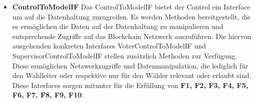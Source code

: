 \documentclass[parskip=full]{scrartcl}
\newcommand{\fakeparagraph}[1]{\textbf{#1}}
\begin{document}
	\begin{itemize}
	\item\fakeparagraph{ControlToModelIF} Das ControlToModelIF bietet der Control ein Interface um auf die Datenhaltung zuzugreifen.
	Es werden Methoden bereitgestellt, die es ermöglichen die Daten auf der Datenhaltung zu manipulieren und entsprechende Zugriffe auf das Blockchain Netzwerk auszuführen.
	Die hiervon ausgehenden konkreten Interfaces VoterControlToModelIF und SupervisorControlToModelIF stellen zusätzlich Methoden zur Verfügung. Diese ermöglichen Netzwerkzugriffe und Datenmanipulation, die lediglich für den Wahlleiter oder respektive nur für den Wähler relevant oder erlaubt sind.
	Diese Interfaces sorgen mitunter für die Erfüllung von \textbf{F1, F2, F3, F4, F5, F6, F7, F8, F9, F10}.
	\end{itemize} 
\end{document}
